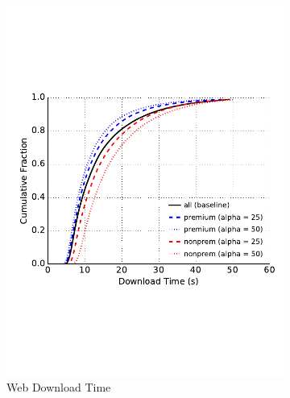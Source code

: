 \begin{figure} \centering
	\begin{subfigure}[t]{0.32\textwidth} \centering
\includegraphics[trim={0 3cm 0 3cm}, clip, width=1.0\textwidth]{images/modifier_pr50_web.pdf}
		\caption{Web Download Time}
\label{fig:modifier_pr50_web}
	\end{subfigure}
	\begin{subfigure}[t]{0.32\textwidth} \centering

\end{subfigure}
\end{figure}
